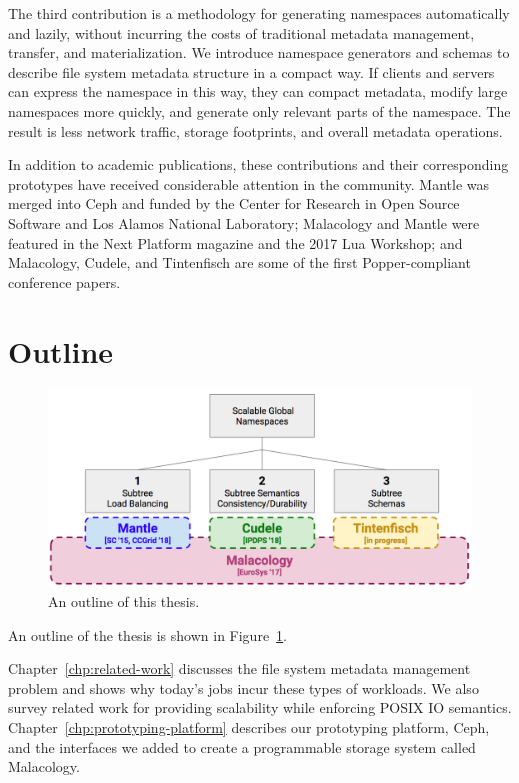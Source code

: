 The third contribution is a methodology for generating namespaces automatically
and lazily, without incurring the costs of traditional metadata management,
transfer, and materialization.  We introduce namespace generators and schemas
to describe file system metadata structure in a compact way. If clients and
servers can express the namespace in this way, they can compact metadata,
modify large namespaces more quickly, and generate only relevant parts of the
namespace. The result is less network traffic, storage footprints, and overall
metadata operations.  

In addition to academic publications, these contributions and their
corresponding prototypes have received considerable attention in the community.
Mantle was merged into Ceph and funded by the Center for Research in Open
Source Software and Los Alamos National Laboratory; Malacology and Mantle were
featured in the Next Platform magazine and the 2017 Lua Workshop; and
Malacology, Cudele, and Tintenfisch are some of the first
Popper-compliant~\cite{jimenez:ipdpsw17-popper} conference papers.

\section{Outline}

\begin{figure}[tb]
  \centering
  \includegraphics[width=1\textwidth]{./chapters/overview.png}
  \caption{An outline of this thesis.}
  \label{fig:thesis-overview}
\end{figure}

An outline of the thesis is shown in Figure~\ref{fig:thesis-overview}.

Chapter~\ref{chp:related-work} discusses the file system metadata management
problem and shows why today's jobs incur these types of workloads. We also
survey related work for providing scalability while enforcing POSIX IO
semantics. Chapter~\ref{chp:prototyping-platform} describes our prototyping
platform, Ceph, and the interfaces we added to create a programmable storage
system called Malacology.

